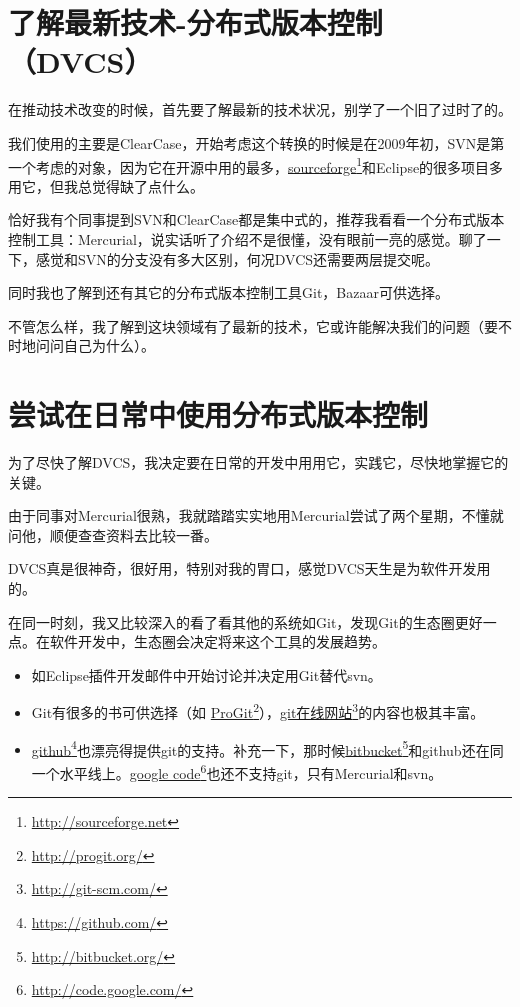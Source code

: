 \section{了解最新技术-分布式版本控制（DVCS）}
\label{了解最新技术-分布式版本控制（dvcs）}

在推动技术改变的时候，首先要了解最新的技术状况，别学了一个旧了过时了的。

我们使用的主要是ClearCase，开始考虑这个转换的时候是在2009年初，SVN是第一个考虑的对象，因为它在开源中用的最多，\href{http://sourceforge.net}{sourceforge}\footnote{\href{http://sourceforge.net}{http:/\slash sourceforge.net}}和Eclipse的很多项目多用它，但我总觉得缺了点什么。

恰好我有个同事提到SVN和ClearCase都是集中式的，推荐我看看一个分布式版本控制工具：Mercurial，说实话听了介绍不是很懂，没有眼前一亮的感觉。聊了一下，感觉和SVN的分支没有多大区别，何况DVCS还需要两层提交呢。

同时我也了解到还有其它的分布式版本控制工具Git，Bazaar可供选择。

不管怎么样，我了解到这块领域有了最新的技术，它或许能解决我们的问题（要不时地问问自己为什么）。

\section{尝试在日常中使用分布式版本控制}
\label{尝试在日常中使用分布式版本控制}

为了尽快了解DVCS，我决定要在日常的开发中用用它，实践它，尽快地掌握它的关键。

由于同事对Mercurial很熟，我就踏踏实实地用Mercurial尝试了两个星期，不懂就问他，顺便查查资料去比较一番。

DVCS真是很神奇，很好用，特别对我的胃口，感觉DVCS天生是为软件开发用的。

在同一时刻，我又比较深入的看了看其他的系统如Git，发现Git的生态圈更好一点。在软件开发中，生态圈会决定将来这个工具的发展趋势。

\begin{itemize}
\item 如Eclipse插件开发邮件中开始讨论并决定用Git替代svn。

\item Git有很多的书可供选择（如 \href{http://progit.org/}{ProGit}\footnote{\href{http://progit.org/}{http:/\slash progit.org\slash }}），\href{http://git-scm.com/}{git在线网站}\footnote{\href{http://git-scm.com/}{http:/\slash git-scm.com\slash }}的内容也极其丰富。

\item \href{https://github.com/}{github}\footnote{\href{https://github.com/}{https:/\slash github.com\slash }}也漂亮得提供git的支持。补充一下，那时候\href{http://bitbucket.org/}{bitbucket}\footnote{\href{http://bitbucket.org/}{http:/\slash bitbucket.org\slash }}和github还在同一个水平线上。\href{http://code.google.com/}{google code}\footnote{\href{http://code.google.com/}{http:/\slash code.google.com\slash }}也还不支持git，只有Mercurial和svn。

\end{itemize}


